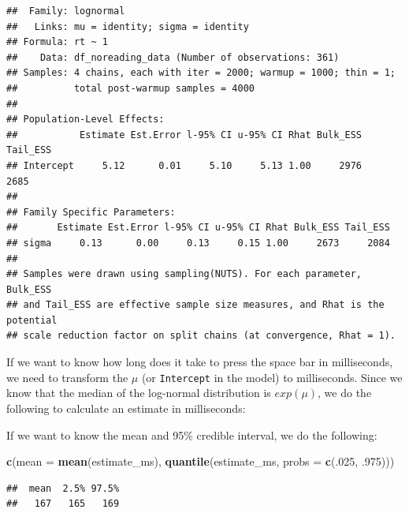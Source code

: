 \documentclass[12pt,]{krantz}
\newenvironment{Shaded}{\begin{snugshade}}{\end{snugshade}}
\newcommand{\DataTypeTok}[1]{\textcolor[rgb]{0.13,0.29,0.53}{#1}}
\newcommand{\DecValTok}[1]{\textcolor[rgb]{0.00,0.00,0.81}{#1}}
\newcommand{\FloatTok}[1]{\textcolor[rgb]{0.00,0.00,0.81}{#1}}
\newcommand{\KeywordTok}[1]{\textcolor[rgb]{0.13,0.29,0.53}{\textbf{#1}}}
\newcommand{\NormalTok}[1]{#1}
\newcommand{\OperatorTok}[1]{\textcolor[rgb]{0.81,0.36,0.00}{\textbf{#1}}}
\newcommand{\StringTok}[1]{\textcolor[rgb]{0.31,0.60,0.02}{#1}}
\theoremstyle{definition}
\theoremstyle{definition}
\theoremstyle{definition}
\theoremstyle{remark}
\begin{document}
\begin{verbatim}
##  Family: lognormal 
##   Links: mu = identity; sigma = identity 
## Formula: rt ~ 1 
##    Data: df_noreading_data (Number of observations: 361) 
## Samples: 4 chains, each with iter = 2000; warmup = 1000; thin = 1;
##          total post-warmup samples = 4000
## 
## Population-Level Effects: 
##           Estimate Est.Error l-95% CI u-95% CI Rhat Bulk_ESS Tail_ESS
## Intercept     5.12      0.01     5.10     5.13 1.00     2976     2685
## 
## Family Specific Parameters: 
##       Estimate Est.Error l-95% CI u-95% CI Rhat Bulk_ESS Tail_ESS
## sigma     0.13      0.00     0.13     0.15 1.00     2673     2084
## 
## Samples were drawn using sampling(NUTS). For each parameter, Bulk_ESS
## and Tail_ESS are effective sample size measures, and Rhat is the potential
## scale reduction factor on split chains (at convergence, Rhat = 1).
\end{verbatim}

If we want to know how long does it take to press the space bar in milliseconds, we need to transform the \(\mu\) (or \texttt{Intercept} in the model) to milliseconds. Since we know that the median of the log-normal distribution is \(exp(\mu)\), we do the following to calculate an estimate in milliseconds:

\begin{Shaded}
\end{Shaded}

If we want to know the mean and 95\% credible interval, we do the following:

\begin{Shaded}
\begin{Highlighting}[]
\KeywordTok{c}\NormalTok{(}\DataTypeTok{mean =} \KeywordTok{mean}\NormalTok{(estimate_ms), }\KeywordTok{quantile}\NormalTok{(estimate_ms, }\DataTypeTok{probs =} \KeywordTok{c}\NormalTok{(.}\DecValTok{025}\NormalTok{, }\FloatTok{.975}\NormalTok{)))}
\end{Highlighting}
\end{Shaded}

\begin{verbatim}
##  mean  2.5% 97.5% 
##   167   165   169
\end{verbatim}
\end{document}
